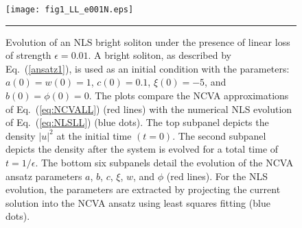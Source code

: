 % 

\begin{figure}[htbp]
 \centering
  \centerline{\texttt{[image: fig1\_LL\_e001N.eps]}}
  \rule{35em}{0.5pt}
  \caption[NLS with Linear Loss, $\epsilon = 0.01$]{Evolution of an NLS bright soliton under the presence of linear loss of strength $\epsilon=0.01$.  A bright soliton, as described by Eq.~(\ref{ansatz1}), is used as an initial condition with the parameters:  $a(0)=w(0)=1$, $c(0)=0.1$, $\xi(0) = -5$, and $b(0)=\phi(0)=0$.  The plots compare the NCVA approximations of Eq.~(\ref{eq:NCVALL}) (red lines) with the numerical NLS evolution of  Eq.~(\ref{eq:NLSLL}) (blue dots).  The top subpanel depicts the density $|u|^2$ at the initial time $(t=0)$.  The second subpanel depicts the density after the system is evolved for a total time of $t=1/\epsilon$.  The bottom six subpanels detail the evolution of the NCVA ansatz parameters $a$, $b$, $c$, $\xi$, $w$, and $\phi$ (red lines).  For the NLS evolution, the parameters are extracted by projecting the current solution into the NCVA ansatz using least squares fitting (blue dots).}
 \label{fig:Loss001}
\end{figure}


